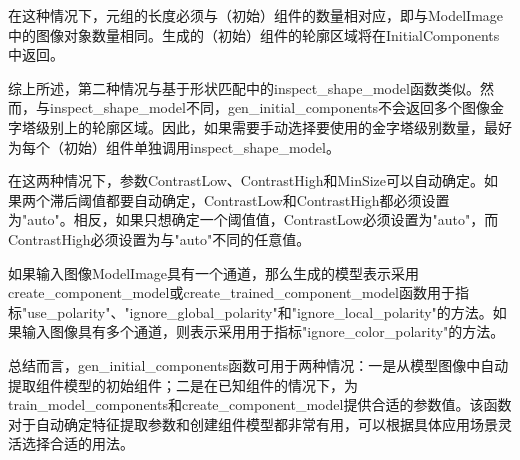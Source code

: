 \documentclass{article}
\begin{document}
在这种情况下，元组的长度必须与（初始）组件的数量相对应，即与ModelImage中的图像对象数量相同。生成的（初始）组件的轮廓区域将在InitialComponents中返回。

综上所述，第二种情况与基于形状匹配中的inspect\_shape\_model函数类似。然而，与inspect\_shape\_model不同，gen\_initial\_components不会返回多个图像金字塔级别上的轮廓区域。因此，如果需要手动选择要使用的金字塔级别数量，最好为每个（初始）组件单独调用inspect\_shape\_model。

在这两种情况下，参数ContrastLow、ContrastHigh和MinSize可以自动确定。如果两个滞后阈值都要自动确定，ContrastLow和ContrastHigh都必须设置为"auto"。相反，如果只想确定一个阈值值，ContrastLow必须设置为"auto"，而ContrastHigh必须设置为与"auto"不同的任意值。

如果输入图像ModelImage具有一个通道，那么生成的模型表示采用create\_component\_model或create\_trained\_component\_model函数用于指标"use\_polarity"、"ignore\_global\_polarity"和"ignore\_local\_polarity"的方法。如果输入图像具有多个通道，则表示采用用于指标"ignore\_color\_polarity"的方法。

总结而言，gen\_initial\_components函数可用于两种情况：一是从模型图像中自动提取组件模型的初始组件；二是在已知组件的情况下，为train\_model\_components和create\_component\_model提供合适的参数值。该函数对于自动确定特征提取参数和创建组件模型都非常有用，可以根据具体应用场景灵活选择合适的用法。
\end{document}
